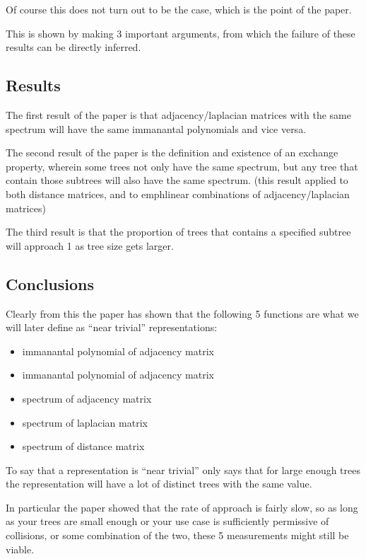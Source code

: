 \documentclass{article}
\begin{document}
Of course this does not turn out to be the case, which is the point of the
paper.

This is shown by making 3 important arguments, from which the failure of these
results can be directly inferred.

\subsection{Results}

The first result of the paper is that adjacency/laplacian matrices with the
same spectrum will have the same immanantal polynomials and vice versa.

The second result of the paper is the definition and existence of an exchange
property, wherein some trees not only have the same spectrum, but any tree that
contain those subtrees will also have the same spectrum. (this result applied
to both distance matrices, and to emph{linear combinations} of
adjacency/laplacian matrices)

The third result is that the proportion of trees that contains a specified
subtree will approach 1 as tree size gets larger.

\subsection{Conclusions}

Clearly from this the paper has shown that the following 5 functions are what
we will later define as ``near trivial'' representations:
\begin{itemize}
	\item immanantal polynomial of adjacency matrix
	\item immanantal polynomial of adjacency matrix
	\item spectrum of adjacency matrix
	\item spectrum of laplacian matrix
	\item spectrum of distance matrix
\end{itemize}

To say that a representation is ``near trivial'' only says that for large
enough trees the representation will have a lot of distinct trees with the same
value.

In particular the paper showed that the rate of approach is fairly slow, so as
long as your trees are small enough or your use case is sufficiently permissive
of collisions, or some combination of the two, these 5 measurements might still
be viable.
\end{document}
